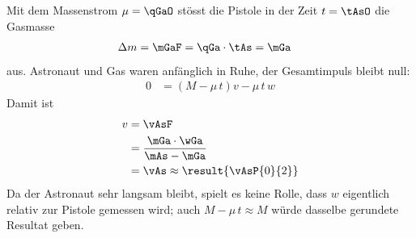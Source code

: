 \begin{center}
\end{center}

Mit dem Massenstrom $\mu = \qGaO$ stösst die Pistole in der Zeit $t = \tAsO$ die Gasmasse
\begin{align}
 \Delta m &= \mGaF = \qGa\cdot\tAs = \mGa
\end{align}
aus. Astronaut und Gas waren anfänglich in Ruhe, der Gesamtimpuls bleibt null:
\begin{align}
 0 &= \left(M-\mu\,t\right)v - \mu\,t\,w
\end{align}
Damit ist
\begin{align}
 v &= \vAsF \\
   &= \frac{\mGa\cdot\wGa}{\mAs-\mGa} \\
   &= \vAs \approx \result{\vAsP{0}{2}}
\end{align}
Da der Astronaut sehr langsam bleibt, spielt es keine Rolle, dass $w$ eigentlich relativ zur Pistole gemessen wird; auch $M-\mu\,t \approx M$ würde dasselbe gerundete Resultat geben.
